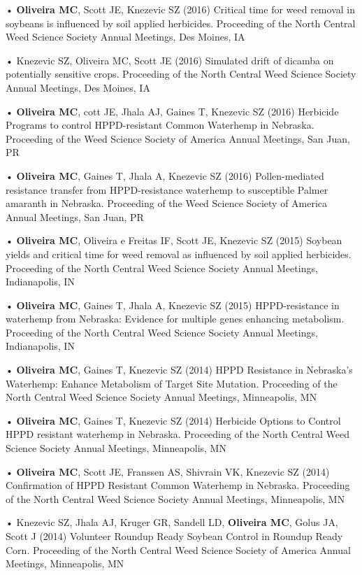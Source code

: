 \documentclass[11pt,]{article}
\begin{document}
• \textbf{Oliveira MC}, Scott JE, Knezevic SZ (2016) Critical time for
weed removal in soybeans is influenced by soil applied herbicides.
Proceeding of the North Central Weed Science Society Annual Meetings,
Des Moines, IA

• Knezevic SZ, Oliveira MC, Scott JE (2016) Simulated drift of dicamba
on potentially sensitive crops. Proceeding of the North Central Weed
Science Society Annual Meetings, Des Moines, IA

• \textbf{Oliveira MC}, cott JE, Jhala AJ, Gaines T, Knezevic SZ (2016)
Herbicide Programs to control HPPD-resistant Common Waterhemp in
Nebraska. Proceeding of the Weed Science Society of America Annual
Meetings, San Juan, PR

• \textbf{Oliveira MC}, Gaines T, Jhala A, Knezevic SZ (2016)
Pollen-mediated resistance transfer from HPPD-resistance waterhemp to
susceptible Palmer amaranth in Nebraska. Proceeding of the Weed Science
Society of America Annual Meetings, San Juan, PR

• \textbf{Oliveira MC}, Oliveira e Freitas IF, Scott JE, Knezevic SZ
(2015) Soybean yields and critical time for weed removal as influenced
by soil applied herbicides. Proceeding of the North Central Weed Science
Society Annual Meetings, Indianapolis, IN

• \textbf{Oliveira MC}, Gaines T, Jhala A, Knezevic SZ (2015)
HPPD-resistance in waterhemp from Nebraska: Evidence for multiple genes
enhancing metabolism. Proceeding of the North Central Weed Science
Society Annual Meetings, Indianapolis, IN

• \textbf{Oliveira MC}, Gaines T, Knezevic SZ (2014) HPPD Resistance in
Nebraska's Waterhemp: Enhance Metabolism of Target Site Mutation.
Proceeding of the North Central Weed Science Society Annual Meetings,
Minneapolis, MN

• \textbf{Oliveira MC}, Gaines T, Knezevic SZ (2014) Herbicide Options
to Control HPPD resistant waterhemp in Nebraska. Proceeding of the North
Central Weed Science Society Annual Meetings, Minneapolis, MN

• \textbf{Oliveira MC}, Scott JE, Franssen AS, Shivrain VK, Knezevic SZ
(2014) Confirmation of HPPD Resistant Common Waterhemp in Nebraska.
Proceeding of the North Central Weed Science Society Annual Meetings,
Minneapolis, MN

• Knezevic SZ, Jhala AJ, Kruger GR, Sandell LD, \textbf{Oliveira MC},
Golus JA, Scott J (2014) Volunteer Roundup Ready Soybean Control in
Roundup Ready Corn. Proceeding of the North Central Weed Science Society
of America Annual Meetings, Minneapolis, MN
\end{document}
